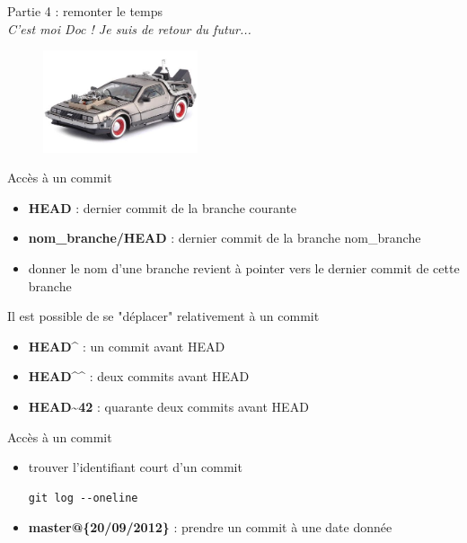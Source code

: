 \documentclass{beamer}
\begin{document}
\begin{frame}
	\begin{center}
 		\Large{Partie 4 : remonter le temps}\\
 		{\small  \textit{C'est moi Doc ! Je suis de retour du futur...}}
	\end{center}

	\begin{figure}
		\centering
		\includegraphics[height=3cm]{img/delorean}
	\end{figure}
\end{frame}

\begin{frame}{Accès à un commit}
	
	\begin{itemize}
		\item \textbf{HEAD} :  dernier commit de la branche courante
		\item \textbf{nom\_branche\//HEAD} : dernier commit de la branche nom\_branche
		\item donner le nom d'une branche revient à pointer vers le dernier commit de cette branche 
	\end{itemize}
	\bigskip
	Il est possible de se "déplacer" relativement à un commit
	\begin{itemize}
		\item \textbf{HEAD\^ } : un commit avant HEAD
		\item \textbf{HEAD\^{}\^{} } : deux commits avant HEAD
		\item \textbf{HEAD\~{}42 } : quarante deux commits avant HEAD
	\end{itemize}
\end{frame}

\begin{frame}[fragile]{Accès à un commit}
	\begin{itemize}
		\item trouver l'identifiant court d'un commit
		\begin{lstlisting}[frame=single]
		git log --oneline
		\end{lstlisting}
		\item \textbf{master@\{20/09/2012\}} : prendre un commit à une date donnée
	\end{itemize}	
\end{frame}
\end{document}
